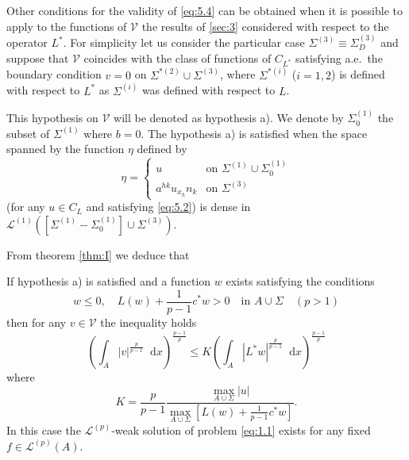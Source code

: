 \documentclass[a4paper,12pt,leqno]{article}
\numberwithin{equation}{section}
\newenvironment{thm}[1]
{\renewcommand\theinnerproblem{#1}\innerproblem}
{\endinnerproblem}
\newcommand{\dd}{\mathop{}\!\mathrm{d}}
\begin{document}
Other conditions for the validity of \eqref{eq:5.4} can be obtained when it is possible to apply to the functions of $\mathscr{V}$ the results of \cref{sec:3} considered with respect to the operator $L^{*}$. For simplicity let us consider the particular case $\Sigma^{(3)} \equiv \Sigma_{D}^{(3)}$ and suppose that $\mathscr{V}$ coincides with the class of functions of $C_{L^{*}}$ satisfying a.e.\ the boundary condition $v=0$ on $\Sigma^{*(2)} \cup \Sigma^{(3)}$, where $\Sigma^{*(i)}$ ($i=1,2$) is defined with respect to $L^{*}$ as $\Sigma^{(i)}$ was defined with respect to $L$.

This hypothesis on $\mathscr{V}$ will be denoted as hypothesis a). We denote by $\Sigma_{0}^{(1)}$ the subset of $\Sigma^{(1)}$ where $b=0$. The hypothesis a) is satisfied when the space spanned by the function $\eta$ defined by
\begin{equation*}
	\eta =
	\begin{cases}
		u & \text{on } \Sigma^{(1)}\cup\Sigma_0^{(1)} \\
		a^{h k} u_{x_{h}}{n}_{k} & \text{on } \Sigma^{(3)}
	\end{cases}
\end{equation*}
(for any $u \in C_{L}$ and satisfying \eqref{eq:5.2}) is dense in $\mathscr{L}^{(1)} \left(\left[\Sigma^{(1)}-\Sigma_{0}^{(1)}\right] \cup \Sigma^{(3)}\right)$.

From theorem \ref{thm:I} we deduce that

\begin{thm}{XVIII} \label{XVIII}
	If hypothesis a) is satisfied and a function $w$ exists satisfying the conditions
	\begin{equation*}
		w \leq 0, \quad 
		L(w)+\frac{1}{p-1} c^{*} w>0 \quad 
		\text{in }
		A \cup \Sigma \quad (p>1)
	\end{equation*}
	then for any $v \in \mathscr{V}$ the inequality holds
	\begin{equation*}
		\left(\int_{A}|v|^{\frac{p}{p-1}} \dd x\right)^{\frac{p-1}{p}} \leq K\left(\int_{A}\left|L^{*} w\right|^{\frac{p}{p-1}} \dd x\right)^{\frac{p-1}{p}}
	\end{equation*}
	where
	\begin{equation*}
		K=\frac{p}{p-1} \frac{\underset{A \cup \Sigma}{\max} |u|}{\underset{A \cup \Sigma}{\max} \left[L(w)+\frac{1}{p-1} c^{*} w\right]}.
	\end{equation*}
	In this case the $\mathscr{L}^{(p)}$-weak solution of problem \eqref{eq:1.1} exists for any fixed $f \in \mathscr{L}^{(p)}(A)$.
\end{thm}
\end{document}
